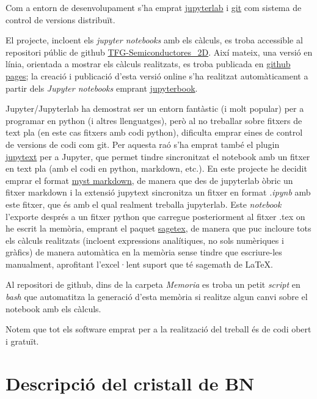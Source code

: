 \documentclass[12pt]{article} %
\begin{document}
Com a entorn de desenvolupament s'ha emprat \href{https://jupyter.org/}{jupyterlab} i \href{https://git-scm.com/}{git} com sistema de control de versions distribuït. 

El projecte, incloent els \textit{\foreignlanguage{english}{jupyter notebooks}} amb els càlculs, es troba accessible al repositori públic de github \href{https://github.com/CasimirVictoria/TFG-Semiconductores\_2D}{TFG-Semiconductores\_2D}. Així mateix, una versió en línia, orientada a mostrar els càlculs realitzats, es troba publicada en \href{https://casimirvictoria.github.io/TFG-Semiconductores_2D/index.html}{github pages}; la creació i publicació d'esta versió online s'ha realitzat automàticament a partir dels \textit{Jupyter notebooks} emprant \href{https://jupyterbook.org/intro.html}{jupyterbook}.

Jupyter/Jupyterlab ha demostrat ser un entorn fantàstic (i molt popular) per a programar en python (i altres llenguatges), però al no treballar sobre fitxers de text pla (en este cas fitxers amb codi python), dificulta emprar eines de control de versions de codi com git. Per aquesta raó s’ha emprat també el plugin \href{https://jupytext.readthedocs.io/en/latest/}{jupytext} per a Jupyter, que permet tindre sincronitzat el notebook amb un fitxer en text pla (amb el codi en python, markdown, etc.). En este projecte he decidit emprar el format \href{https://jupyterbook.org/content/myst.html}{myst markdown}, de manera que des de jupyterlab òbric un fitxer markdown i la extensió jupytext sincronitza un fitxer en format \textit{.ipynb} amb este fitxer, que és amb el qual realment treballa jupyterlab. Este \emph{notebook} l'exporte després a un fitxer python que carregue posteriorment al fitxer .tex on he escrit la memòria, emprant el paquet \href{https://ctan.org/pkg/sagetex}{sagetex}, de manera que puc incloure tots els càlculs realitzats (incloent expressions analítiques, no sols numèriques i gràfics) de manera automàtica en la memòria sense tindre que escriure-les manualment, aprofitant l'excel·lent suport que té sagemath de \LaTeX . 

Al repositori de github, dins de la carpeta \textit{Memoria} es troba un petit \textit{script} en \textit{bash} que automatitza la generació d'esta memòria si realitze algun canvi sobre el notebook amb els càlculs.

Notem que tot els software emprat per a la realització del treball és de codi obert i gratuït.

\section{Descripció del cristall de BN}
\end{document}
